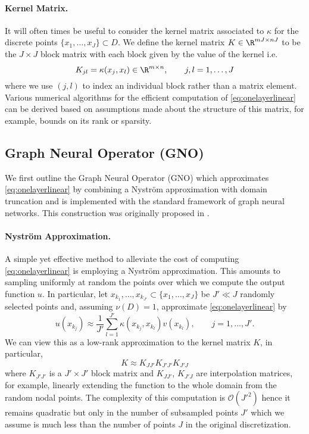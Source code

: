 \paragraph{Kernel Matrix.} It will often times be useful to consider the kernel matrix associated to \(\kappa\) for the discrete points \(\{x_1,\dots,x_J\} \subset D\). We define the kernel matrix \(K \in \R^{mJ \times nJ}\) to be the \(J \times J\) block matrix with each block given by the value of the kernel i.e. 
\[K_{jl} = \kappa(x_j, x_l) \in \R^{m \times n}, \qquad j,l=1,\dots,J\]
where we use \((j,l)\) to index an individual block rather than a matrix element. Various numerical algorithms for the efficient computation of \eqref{eq:onelayerlinear} can be derived based on assumptions made about the structure of this matrix, for example, bounds on its rank or sparsity.

\subsection{Graph Neural Operator (GNO)}
\label{sec:graphneuraloperator}

We first outline the Graph Neural Operator (GNO) which approximates \eqref{eq:onelayerlinear} by combining a Nystr\"om approximation with domain truncation and is implemented with the standard framework of graph neural networks. This construction was originally proposed in \cite{li2020neural}.

\paragraph{Nystr\"om Approximation. }
A simple yet effective method to alleviate the cost of computing \eqref{eq:onelayerlinear} is employing a Nystr\"om approximation. This amounts to sampling uniformly at random the points over which we compute the output function \(u\). In particular, let \(x_{k_1},\dots,x_{k_{J'}} \subset \{x_1,\dots,x_J\}\) be \(J' \ll J\) randomly selected points and, assuming \(\nu(D) = 1\), approximate \eqref{eq:onelayerlinear} by
\[u(x_{k_j}) \approx \frac{1}{J'} \sum_{l=1}^{J'} \kappa(x_{k_j}, x_{k_l}) v(x_{k_l}), \qquad j=1,\dots,J'.\]
We can view this as a low-rank approximation to the kernel matrix \(K\), in particular,
\begin{equation}
    \label{eq:nystrom_matrix}
    K \approx K_{J J'} K_{J' J'} K_{J' J}
\end{equation}
where \(K_{J' J'}\) is a \(J' \times J'\) block matrix and \(K_{J J'}\), \(K_{J' J}\) are interpolation matrices, for example, linearly extending the function to the whole domain from the random nodal points. 
The complexity of this computation is \(\mathcal{O}(J'^2)\) hence it remains quadratic but only in the number of subsampled points \(J'\) which we assume is much less than the number of points \(J\) in the original  discretization. 


